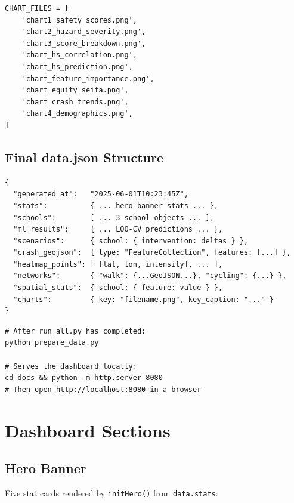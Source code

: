 \documentclass[11pt,a4paper,openany]{book}
\begin{document}
\begin{lstlisting}[style=python, caption={Chart files copied to docs/data/charts/.}]
CHART_FILES = [
    'chart1_safety_scores.png',
    'chart2_hazard_severity.png',
    'chart3_score_breakdown.png',
    'chart_hs_correlation.png',
    'chart_hs_prediction.png',
    'chart_feature_importance.png',
    'chart_equity_seifa.png',
    'chart_crash_trends.png',
    'chart4_demographics.png',
]
\end{lstlisting}

\subsection{Final data.json Structure}

\begin{lstlisting}[style=text, caption={Top-level keys in data.json}]
{
  "generated_at":   "2025-06-01T10:23:45Z",
  "stats":          { ... hero banner stats ... },
  "schools":        [ ... 3 school objects ... ],
  "ml_results":     { ... LOO-CV predictions ... },
  "scenarios":      { school: { intervention: deltas } },
  "crash_geojson":  { type: "FeatureCollection", features: [...] },
  "heatmap_points": [ [lat, lon, intensity], ... ],
  "networks":       { "walk": {...GeoJSON...}, "cycling": {...} },
  "spatial_stats":  { school: { feature: value } },
  "charts":         { key: "filename.png", key_caption: "..." }
}
\end{lstlisting}

\begin{lstlisting}[style=bash, caption={Running prepare\_data.py.}]
# After run_all.py has completed:
python prepare_data.py

# Serves the dashboard locally:
cd docs && python -m http.server 8080
# Then open http://localhost:8080 in a browser
\end{lstlisting}

\section{Dashboard Sections}

\subsection{Hero Banner}

Five stat cards rendered by \texttt{initHero()} from \texttt{data.stats}:
\end{document}

